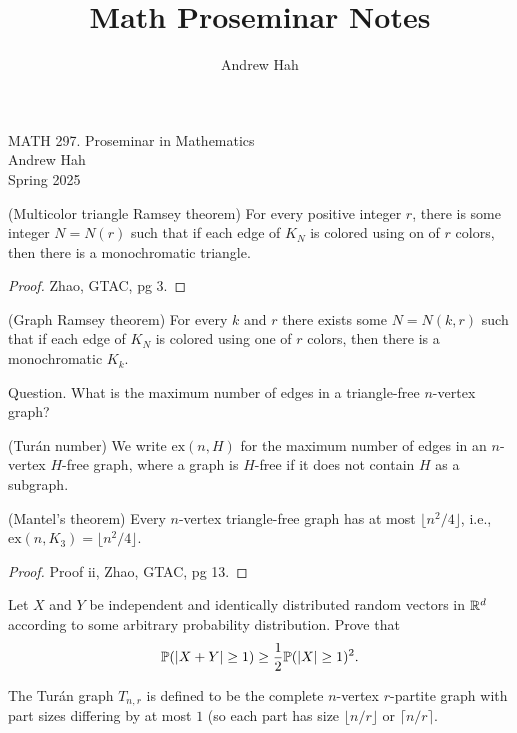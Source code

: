 \documentclass[11pt]{article}
\title{Math Proseminar Notes}
\author{Andrew Hah}
\begin{document}
\pagestyle{plain}
\begin{center}
{\Large MATH 297. Proseminar in Mathematics} \\
\vspace{.2in}  
Andrew Hah \\
Spring 2025
\end{center}

\begin{theorem} (Multicolor triangle Ramsey theorem) For every positive integer $r$, there is some integer $N = N(r)$ such that if each edge of $K_N$ is colored using on of $r$ colors, then there is a monochromatic triangle.
\end{theorem}
\begin{proof} Zhao, GTAC, pg 3.
\end{proof}

\begin{theorem} (Graph Ramsey theorem) For every $k$ and $r$ there exists some $N = N(k, r)$ such that if each edge of $K_N$ is colored using one of $r$ colors, then there is a monochromatic $K_k$.
\end{theorem}

Question. What is the maximum number of edges in a triangle-free $n$-vertex graph?

\begin{definition} (Turán number) We write $\mathrm{ex} (n, H)$ for the maximum number of edges in an $n$-vertex $H$-free graph, where a graph is $H$-free if it does not contain $H$ as a subgraph.
\end{definition}

\begin{theorem} (Mantel's theorem) Every $n$-vertex triangle-free graph has at most $\lfloor n^2 /4 \rfloor$, i.e., $\mathrm{ex}(n, K_3) = \lfloor n^2 /4 \rfloor$.
\end{theorem}
\begin{proof} Proof ii, Zhao, GTAC, pg 13.
\end{proof}

\begin{exercise} Let $X$ and $Y$ be independent and identically distributed random vectors in $\mathbb{R}^d$ according to some arbitrary probability distribution. Prove that \begin{align*} \mathbb{P} (| X + Y | \ge 1) \ge \frac{1}{2} \mathbb{P} (|X| \ge 1)^2.
\end{align*}
\end{exercise}

\begin{definition} The Turán graph $T_{n, r}$ is defined to be the complete $n$-vertex $r$-partite graph with part sizes differing by at most $1$ (so each part has size $\lfloor n/ r \rfloor$ or $\lceil n / r \rceil$.
\end{definition}
\end{document}
